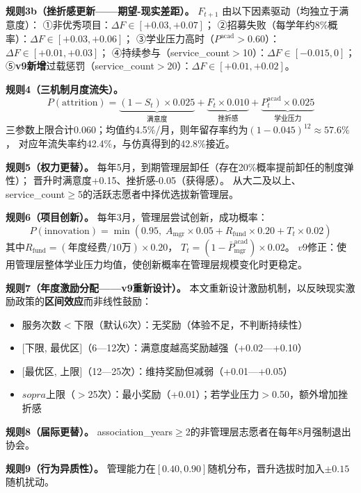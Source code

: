 \documentclass[12pt,a4paper]{article}
\begin{document}
\textbf{规则3b（挫折感更新——期望-现实差距）。}
$F_{t+1}$ 由以下因素驱动（均独立于满意度）：
①非优秀项目：$\Delta F\in[+0.03,+0.07]$；
②招募失败（每学年约8\%概率）：$\Delta F\in[+0.03,+0.06]$；
③学业压力高时（$P^{\text{acad}}>0.60$）：$\Delta F\in[+0.01,+0.03]$；
④持续参与（service\_count$>$10）：$\Delta F\in[-0.015,0]$；
⑤\textbf{v9新增}过载惩罚（service\_count$>$20）：$\Delta F\in[+0.01,+0.02]$。

\textbf{规则4（三机制月度流失）。}
\begin{equation}
P(\text{attrition}) = \underbrace{(1-S_t)\times 0.025}_{\text{满意度}} + \underbrace{F_t\times 0.010}_{\text{挫折感}} + \underbrace{P_t^{\text{acad}}\times 0.025}_{\text{学业压力}}
\end{equation}
三参数上限合计0.060；均值约4.5\%/月，则年留存率约为$(1-0.045)^{12}\approx 57.6\%$，
对应年流失率约42.4\%，与仿真得到的42.8\%接近。

\textbf{规则5（权力更替）。}
每年5月，到期管理层卸任（存在20\%概率提前卸任的制度弹性）；
晋升时满意度+0.15、挫折感-0.05（获得感）。
从大二及以上、service\_count$\geq$5的活跃志愿者中择优选拔新管理层。

\textbf{规则6（项目创新）。}
每年3月，管理层尝试创新，成功概率：
\begin{equation}
P(\text{innovation}) = \min\!\left(0.95,\; A_{\text{mgr}}\times 0.05 + R_{\text{fund}}\times 0.20 + T_t\times 0.02\right)
\end{equation}
其中$R_{\text{fund}}=(\text{年度经费}/10\text{万})\times 0.20$，
$T_t=(1-\bar{P}^{\text{acad}}_{\text{mgr}})\times 0.02$。
$v9$修正：使用管理层整体学业压力均值，使创新概率在管理层规模变化时更稳定。

\textbf{规则7（年度激励分配——v9重新设计）。}
本文重新设计激励机制，以反映现实激励政策的\textbf{区间效应}而非线性鼓励：
\begin{itemize}
\item 服务次数$<$下限（默认6次）：无奖励（体验不足，不判断持续性）
\item $[$下限, 最优区$]$（6—12次）：满意度越高奖励越强（+0.02—+0.10）
\item $[$最优区, 上限$]$（12—25次）：维持奖励但减弱（+0.01—+0.05）
\item $ sopra$上限（$>$25次）：最小奖励（+0.01）；若学业压力$>$0.50，额外增加挫折感
\end{itemize}

\textbf{规则8（届际更替）。}
association\_years$\geq$2的非管理层志愿者在每年8月强制退出协会。

\textbf{规则9（行为异质性）。}
管理能力在$[0.40,0.90]$随机分布，晋升选拔时加入$\pm0.15$随机扰动。
\end{document}

